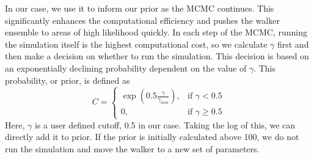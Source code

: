 In our case, we use it to inform our prior as the MCMC continues. This significantly enhances the computational efficiency and pushes the walker ensemble to areas of high likelihood quickly. In each step of the MCMC, running the simulation itself is the highest computational cost, so we calculate $\gamma$ first and then make a decision on whether to run the simulation. This decision is based on an exponentially declining probability dependent on the value of $\gamma$. This probability, or prior, is defined as 
\begin{equation}\label{tidal_prob}
    C = 
    \begin{cases}
        \exp(0.5\frac{\gamma}{\gamma_{min}}), & \text{if } \gamma < 0.5 \\
        0, & \text{if } \gamma \geq 0.5
    \end{cases}
\end{equation}
Here, $\gamma$ is a user defined cutoff, 0.5 in our case. Taking the log of this, we can directly add it to prior. If the prior is initially calculated above 100, we do not run the simulation and move the walker to a new set of parameters.

